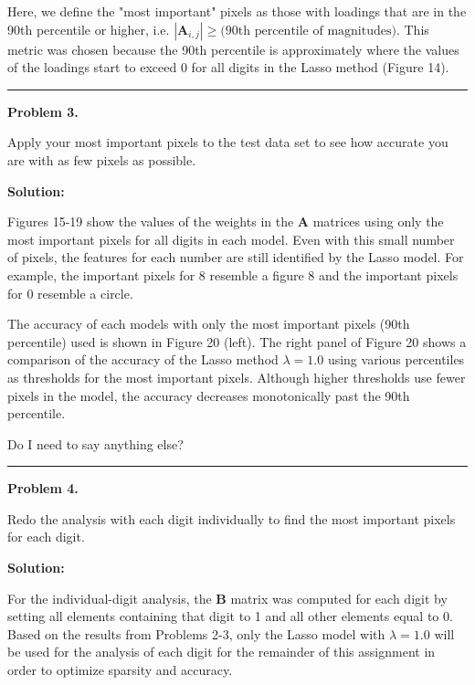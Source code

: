 \documentclass[10pt]{article}
\begin{document}
Here, we define the "most important" pixels as those with loadings that are in the 90th percentile or higher, i.e. $|\textbf{A}_{i, j}| \geq \text{(90th percentile of magnitudes)}$. This metric was chosen because the 90th percentile is approximately where the values of the loadings start to exceed 0 for all digits in the Lasso method (Figure 14). %


\vskip 1cm
\hrule
{\bf Problem 3.}

Apply your most important pixels to the test data set to see how accurate you are with as few pixels as possible.

\vskip 0.5cm
{\bf Solution:} 

Figures 15-19 show the values of the weights in the $\textbf{A}$ matrices using only the most important pixels for all digits in each model. Even with this small number of pixels, the features for each number are still identified by the Lasso model. For example, the important pixels for 8 resemble a figure 8 and the important pixels for 0 resemble a circle. %

The accuracy of each models with only the most important pixels (90th percentile) used is shown in Figure 20 (left). The right panel of Figure 20 shows a comparison of the accuracy of the Lasso method $\lambda=1.0$ using various percentiles as thresholds for the most important pixels. Although higher thresholds use fewer pixels in the model, the accuracy decreases monotonically past the 90th percentile. %

{\color{red} Do I need to say anything else?}


\vskip 1cm
\hrule
{\bf Problem 4.}

Redo the analysis with each digit individually to find the most important pixels for each digit.

\vskip 0.5cm
{\bf Solution:} 


For the individual-digit analysis, the $\textbf{B}$ matrix was computed for each digit by setting all elements containing that digit to 1 and all other elements equal to 0. Based on the results from Problems 2-3, only the Lasso model with $\lambda=1.0$ will be used for the analysis of each digit for the remainder of this assignment in order to optimize sparsity and accuracy.
\end{document}
